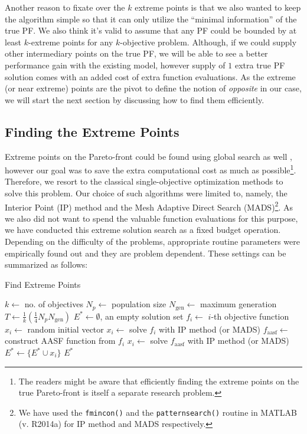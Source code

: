 \documentclass[journal]{IEEEtran}
\let\MYoriglatexcaption\caption
\renewcommand{\caption}[2][\relax]{\MYoriglatexcaption[#2]{#2}}
\begin{document}
Another reason to fixate over the \(k\) extreme points is that we also wanted to keep the algorithm simple so that it can only utilize the ``minimal information'' of the true PF. We also think it's valid to assume that any PF could be bounded by at least \(k\)-extreme points for any \(k\)-objective problem. Although, if we could supply other intermediary points on the true PF, we will be able to see a better performance gain with the existing model, however supply of \(1\) extra true PF solution comes with an added cost of extra function evaluations. As the extreme (or near extreme) points are the pivot to define the notion of \textit{opposite} in our case, we will start the next section by discussing how to find them efficiently.

\subsection{Finding the Extreme Points}
\label{sec:find-extreme-points}
Extreme points on the Pareto-front could be found using global search as well \cite{nadir-estimation}, however our goal was to save the extra computational cost as much as possible\footnote{The readers might be aware that efficiently finding the extreme points on the true Pareto-front is itself a separate research problem.}. Therefore, we resort to the classical single-objective optimization methods to solve this problem. Our choice of such algorithms were limited to, namely, the Interior Point (IP) method and the Mesh Adaptive Direct Search (MADS)\footnote{We have used the \texttt{fmincon()} and the \texttt{patternsearch()} routine in MATLAB (v. R2014a) for IP method and MADS respectively.}. As we also did not want to spend the valuable function evaluations for this purpose, we have conducted this extreme solution search as a fixed budget operation. Depending on the difficulty of the problems, appropriate routine parameters were empirically found out and they are problem dependent. These settings can be summarized as follows: 
%
\begin{algorithm}[pb]
\caption{Find Extreme Points}
\label{algo:find-extreme-points}
\begin{algorithmic}[1]
	\STATE $k \leftarrow$ no. of objectives
	\STATE $N_p \leftarrow$ population size
	\STATE $N_{\text{gen}} \leftarrow$ maximum generation
	\STATE $T \leftarrow \frac{1}{k}(\frac{1}{4}N_p N_{\text{gen}})$
	\STATE $E^\ast \leftarrow \emptyset$, an empty solution set
		\STATE $f_i \leftarrow$ $i$-th objective function
		\STATE $x_i \leftarrow $ random initial vector
		\REPEAT
			\STATE $x_i \leftarrow$ solve $f_i$ with IP method (or MADS) 
		\STATE $f_{\text{aasf}} \leftarrow $ construct AASF function from $f_i$
		\REPEAT
			\STATE $x_i \leftarrow$ solve $f_{\text{aasf}}$ with  IP method (or MADS)
		\STATE $E^\ast \leftarrow \{E^\ast \cup x_i\}$
	\ENDFOR
	\RETURN $E^\ast$
\end{algorithmic}
\end{algorithm}
\end{document}
